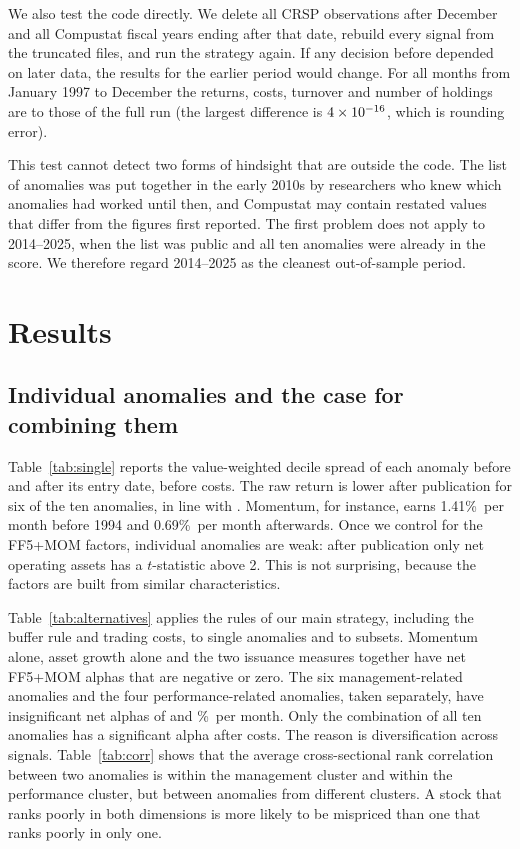 \documentclass[12pt,a4paper]{article}
\newcommand{\pmo}{\%~per month}
\begin{document}
We also test the code directly. We delete all CRSP observations after December \lacut{} and all Compustat fiscal years ending after that date, rebuild every signal from the truncated files, and run the strategy again. If any decision before \lacut{} depended on later data, the results for the earlier period would change. For all \lamonths{} months from January 1997 to December \lacut{} the returns, costs, turnover and number of holdings are \lapass{} to those of the full run (the largest difference is $4\times 10^{-16}$, which is rounding error).

This test cannot detect two forms of hindsight that are outside the code. The list of anomalies was put together in the early 2010s by researchers who knew which anomalies had worked until then, and Compustat may contain restated values that differ from the figures first reported. The first problem does not apply to 2014--2025, when the list was public and all ten anomalies were already in the score. We therefore regard 2014--2025 as the cleanest out-of-sample period.

\section{Results}\label{sec:results}

\subsection{Individual anomalies and the case for combining them}
Table~\ref{tab:single} reports the value-weighted decile spread of each anomaly before and after its entry date, before costs. The raw return is lower after publication for six of the ten anomalies, in line with \citet{mclean2016}. Momentum, for instance, earns 1.41\pmo{} before 1994 and 0.69\pmo{} afterwards. Once we control for the FF5+MOM factors, individual anomalies are weak: after publication only net operating assets has a $t$-statistic above 2. This is not surprising, because the factors are built from similar characteristics.

Table~\ref{tab:alternatives} applies the rules of our main strategy, including the buffer rule and trading costs, to single anomalies and to subsets. Momentum alone, asset growth alone and the two issuance measures together have net FF5+MOM alphas that are negative or zero. The six management-related anomalies and the four performance-related anomalies, taken separately, have insignificant net alphas of \altmgmt{} and \altperf\pmo. Only the combination of all ten anomalies has a significant alpha after costs. The reason is diversification across signals. Table~\ref{tab:corr} shows that the average cross-sectional rank correlation between two anomalies is \corrmgmt{} within the management cluster and \corrperf{} within the performance cluster, but \corrcross{} between anomalies from different clusters. A stock that ranks poorly in both dimensions is more likely to be mispriced than one that ranks poorly in only one.
\end{document}
